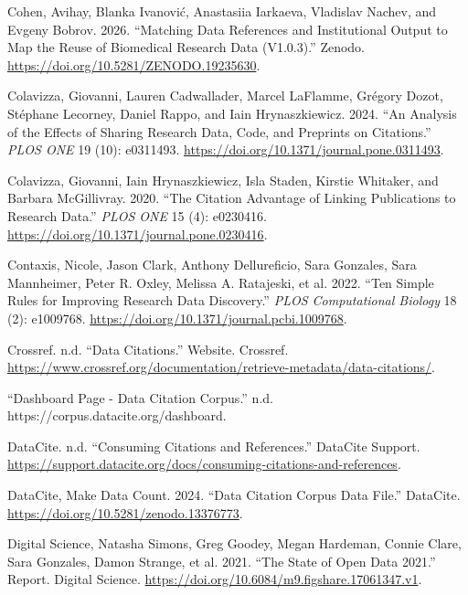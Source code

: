 \documentclass[
  letterpaper,
  DIV=11,
  numbers=noendperiod]{scrartcl}
\newlength{\cslhangindent}
\newenvironment{CSLReferences}[2] %
 {\begin{list}{}{%
  \setlength{\itemindent}{0pt}
  \setlength{\leftmargin}{0pt}
  \setlength{\parsep}{0pt}
  \ifodd #1
   \setlength{\leftmargin}{\cslhangindent}
   \setlength{\itemindent}{-1\cslhangindent}
  \fi
  \setlength{\itemsep}{#2\baselineskip}}}
 {\end{list}}
\begin{document}
\begin{CSLReferences}{1}{0}
Cohen, Avihay, Blanka Ivanović, Anastasiia Iarkaeva, Vladislav Nachev,
and Evgeny Bobrov. 2026. {``Matching Data References and Institutional
Output to Map the Reuse of Biomedical Research Data (V1.0.3).''} Zenodo.
\url{https://doi.org/10.5281/ZENODO.19235630}.

Colavizza, Giovanni, Lauren Cadwallader, Marcel LaFlamme, Grégory Dozot,
Stéphane Lecorney, Daniel Rappo, and Iain Hrynaszkiewicz. 2024. {``An
Analysis of the Effects of Sharing Research Data, Code, and Preprints on
Citations.''} \emph{PLOS ONE} 19 (10): e0311493.
\url{https://doi.org/10.1371/journal.pone.0311493}.

Colavizza, Giovanni, Iain Hrynaszkiewicz, Isla Staden, Kirstie Whitaker,
and Barbara McGillivray. 2020. {``The Citation Advantage of Linking
Publications to Research Data.''} \emph{PLOS ONE} 15 (4): e0230416.
\url{https://doi.org/10.1371/journal.pone.0230416}.

Contaxis, Nicole, Jason Clark, Anthony Dellureficio, Sara Gonzales, Sara
Mannheimer, Peter R. Oxley, Melissa A. Ratajeski, et al. 2022. {``Ten
Simple Rules for Improving Research Data Discovery.''} \emph{PLOS
Computational Biology} 18 (2): e1009768.
\url{https://doi.org/10.1371/journal.pcbi.1009768}.

Crossref. n.d. {``Data Citations.''} Website. Crossref.
\url{https://www.crossref.org/documentation/retrieve-metadata/data-citations/}.

{``Dashboard Page - {Data Citation Corpus}.''} n.d.
https://corpus.datacite.org/dashboard.

DataCite. n.d. {``Consuming {Citations} and {References}.''} DataCite
Support.
\url{https://support.datacite.org/docs/consuming-citations-and-references}.

DataCite, Make Data Count. 2024. {``Data {Citation Corpus Data File}.''}
DataCite. \url{https://doi.org/10.5281/zenodo.13376773}.

Digital Science, Natasha Simons, Greg Goodey, Megan Hardeman, Connie
Clare, Sara Gonzales, Damon Strange, et al. 2021. {``The {State} of
{Open Data} 2021.''} Report. Digital Science.
\url{https://doi.org/10.6084/m9.figshare.17061347.v1}.


\end{CSLReferences}
\end{document}
